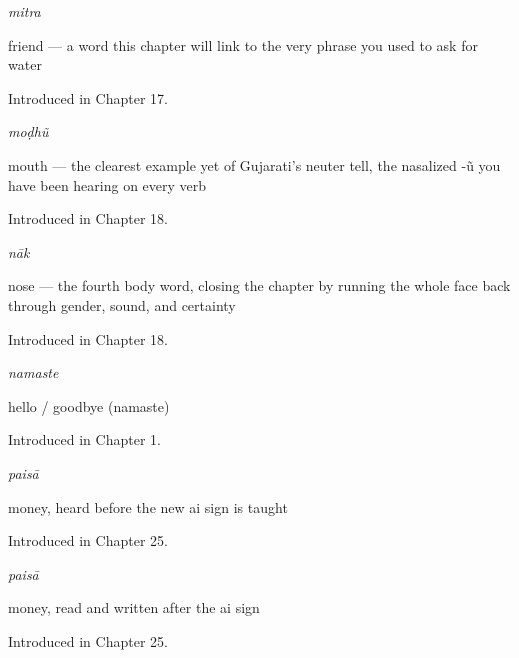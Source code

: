 \noindent\begin{minipage}[t]{\linewidth}
\raggedright
\textbf{}\enspace\emph{mitra}\par
\small friend — a word this chapter will link to the very phrase you used to ask for water\par
\footnotesize Introduced in Chapter 17.
\end{minipage}\par\medskip

\noindent\begin{minipage}[t]{\linewidth}
\raggedright
\textbf{}\enspace\emph{moḍhũ}\par
\small mouth — the clearest example yet of Gujarati's neuter tell, the nasalized -ũ you have been hearing on every verb\par
\footnotesize Introduced in Chapter 18.
\end{minipage}\par\medskip

\noindent\begin{minipage}[t]{\linewidth}
\raggedright
\textbf{}\enspace\emph{nāk}\par
\small nose — the fourth body word, closing the chapter by running the whole face back through gender, sound, and certainty\par
\footnotesize Introduced in Chapter 18.
\end{minipage}\par\medskip

\noindent\begin{minipage}[t]{\linewidth}
\raggedright
\textbf{}\enspace\emph{namaste}\par
\small hello / goodbye (namaste)\par
\footnotesize Introduced in Chapter 1.
\end{minipage}\par\medskip

\noindent\begin{minipage}[t]{\linewidth}
\raggedright
\textbf{}\enspace\emph{paisā}\par
\small money, heard before the new ai sign is taught\par
\footnotesize Introduced in Chapter 25.
\end{minipage}\par\medskip

\noindent\begin{minipage}[t]{\linewidth}
\raggedright
\textbf{}\enspace\emph{paisā}\par
\small money, read and written after the ai sign\par
\footnotesize Introduced in Chapter 25.
\end{minipage}\par\medskip


